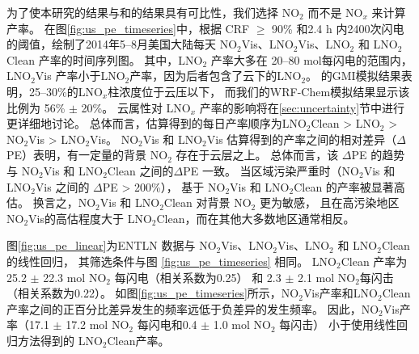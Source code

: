 为了使本研究的结果与\citet{Pickering.2016}和\citet{Lapierre.2020}的结果具有可比性，我们选择 NO$_2$  而不是 NO$_x$  来计算产率。
在图\ref{fig:us_pe_timeseries}中，根据 CRF $\geq$ 90\% 和2.4 h 内2400次闪电的阈值，绘制了2014年5--8月美国大陆每天 NO$_2$Vis、LNO$_2$Vis、LNO$_2$ 和 LNO$_2$Clean 产率的时间序列图。
其中，LNO$_2$ 产率大多在 20--80 mol每闪电的范围内，LNO$_2$Vis 产率小于LNO$_2$产率，因为后者包含了云下的LNO$_2$。
\citet{Pickering.2016}的GMI模拟结果表明，25--30\%的LNO$_x$柱浓度位于云压以下，
而我们的WRF-Chem模拟结果显示该比例为 56\% $\pm$ 20\%。
云属性对 LNO$_x$ 产率的影响将在\ref{sec:uncertainty}节中进行更详细地讨论。
总体而言，估算得到的每日产率顺序为LNO$_2$Clean > LNO$_2$ > NO$_2$Vis > LNO$_2$Vis。
NO$_2$Vis 和 LNO$_2$Vis 估算得到的产率之间的相对差异（$\Delta$PE）表明，有一定量的背景 NO$_2$ 存在于云层之上。
总体而言，该 $\Delta$PE 的趋势与 NO$_2$Vis 和 LNO$_2$Clean 之间的$\Delta$PE 一致。
当区域污染严重时（NO$_2$Vis 和 LNO$_2$Vis 之间的 $\Delta$PE > 200\%），
基于 NO$_2$Vis 和 LNO$_2$Clean 的产率被显著高估。
换言之，NO$_2$Vis 和 LNO$_2$Clean 对背景 NO$_2$ 更为敏感，
且在高污染地区NO$_2$Vis的高估程度大于 LNO$_2$Clean，而在其他大多数地区通常相反。

图\ref{fig:us_pe_linear}为ENTLN 数据与 NO$_2$Vis、LNO$_2$Vis、LNO$_2$ 和 LNO$_2$Clean的线性回归，
其筛选条件与图 \ref{fig:us_pe_timeseries} 相同。
LNO$_2$Clean 产率为 25.2 $\pm$ 22.3 mol NO$_2$ 每闪电（相关系数为0.25）
和 2.3 $\pm$ 2.1 mol NO$_2$每闪击（相关系数为0.22）。
如图\ref{fig:us_pe_timeseries}所示，NO$_2$Vis产率和LNO$_2$Clean产率之间的正百分比差异发生的频率远低于负差异的发生频率。
因此，NO$_2$Vis产率（17.1 $\pm$ 17.2 mol NO$_2$ 每闪电和0.4 $\pm$ 1.0 mol NO$_2$ 每闪击）
小于使用线性回归方法得到的 LNO$_2$Clean产率。


